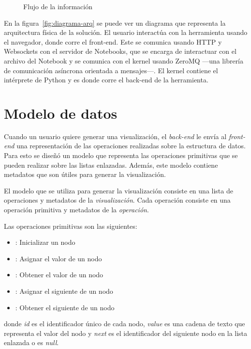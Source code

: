 \begin{figure}[htb]
    \centering
    
    \caption{Flujo de la información}
    \label{fig:flujo-informacion}
\end{figure}

En la figura~\ref{fig:diagrama-arq} se puede ver un diagrama que representa la arquitectura física de la solución. El usuario interactúa con la herramienta usando el navegador, donde corre el front-end. Este se comunica usando HTTP y Websockets con el servidor de Notebooks, que se encarga de interactuar con el archivo del Notebook y se comunica con el kernel usando ZeroMQ ---una librería de comunicación asíncrona orientada a mensajes---. El kernel contiene el intérprete de Python y es donde corre el back-end de la herramienta.

\section{Modelo de datos}
\label{sec:modelo-de-datos}

Cuando un usuario quiere generar una visualización, el \textit{back-end} le envía al \textit{front-end} una representación de las operaciones realizadas sobre la estructura de datos. Para esto se diseñó un modelo que representa las operaciones primitivas que se pueden realizar sobre las listas enlazadas. Además, este modelo contiene metadatos que son útiles para generar la visualización.

El modelo que se utiliza para generar la visualización consiste en una lista de operaciones y metadatos de la \textit{visualización}. Cada operación consiste en una operación primitiva y metadatos de la \textit{operación}.

Las operaciones primitivas son las siguientes:
\begin{itemize}
    \item{}: Inicializar un nodo
    \item{}: Asignar el valor de un nodo
    \item{}: Obtener el valor de un nodo
    \item{}: Asignar el siguiente de un nodo
    \item{}: Obtener el siguiente de un nodo
\end{itemize}
donde \textit{id} es el identificador único de cada nodo, \textit{value} es una cadena de texto que representa el valor del nodo y \textit{next} es el identificador del siguiente nodo en la lista enlazada o es \textit{null}.


